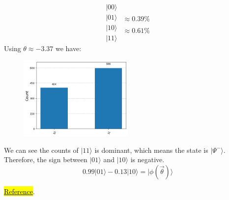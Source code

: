 \documentclass{article}
\begin{document}
\begin{itemize}
\begin{equation*}
\begin{array}{c}
			      |00 \rangle \\
			      |01 \rangle \\
			      |10 \rangle \\
			      |11 \rangle
		      \end{array}
		      \begin{array}{c}
			      \\
			      \approx 0.39\% \\
			      \\
			      \approx 0.61\%
		      \end{array}
	      \end{equation*}
	      Using \(\theta \approx -3.37\) we have:
	      \begin{figure}[H]
		      \centering
		      \includegraphics[width=0.5\textwidth, height=0.3\textheight]{BellHis.png}
	      \end{figure}
	      We can see the counts of \(|11\rangle\) is dominant, which means the state is \(|\Psi^-\rangle\). Therefore, the sign between \(|01\rangle\) and \(|10\rangle\) is negative.
	      \begin{equation}
		      0.99 |01\rangle - 0.13 |10\rangle = |\phi(\vec{\theta}) \rangle
	      \end{equation}

	      \href{https://grishmaprs.medium.com/measurement-based-quantum-computation-9de426f40856}{\hl{Reference}}.



\end{itemize}
\end{document}
